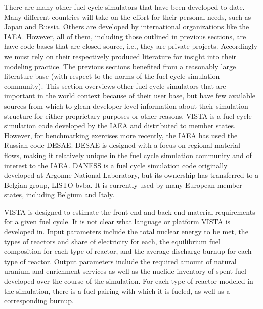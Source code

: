 There are many other fuel cycle simulators that have been developed to
date. Many different countries will take on the effort for their personal needs,
such as Japan and Russia. Others are developed by international organizations
like the IAEA. However, all of them, including those outlined in previous
sections, are have code bases that are closed source, i.e., they are private
projects. Accordingly we must rely on their respectively produced literature for
insight into their modeling practice. The previous sections benefited from a
reasonably large literature base (with respect to the norms of the fuel cycle
simulation community). This section overviews other fuel cycle simulators that
are important in the world context because of their user base, but have few
available sources from which to glean developer-level information about their
simulation structure for either proprietary purposes or other reasons. VISTA is
a fuel cycle simulation code developed by the IAEA and distributed to member
states. However, for benchmarking exercises more recently, the IAEA has used
the Russian code DESAE. DESAE is designed with a focus on regional material
flows, making it relatively unique in the fuel cycle simulation community and of
interest to the IAEA. DANESS is a fuel cycle simulation code originally
developed at Argonne National Laboratory, but its ownership has transferred to a
Belgian group, LISTO bvba. It is currently used by many European member states,
including Belgium and Italy.

VISTA is designed to estimate the front end and back end material requirements
for a given fuel cycle. It is not clear what language or platform VISTA is
developed in. Input parameters include the total nuclear energy to be met, the
types of reactors and share of electricity for each, the equilibrium fuel
composition for each type of reactor, and the average discharge burnup for each
type of reactor. Output parameters include the required amount of natural
uranium and enrichment services as well as the nuclide inventory of spent fuel
developed over the course of the simulation. For each type of reactor modeled in
the simulation, there is a fuel pairing with which it is fueled, as well as a
corresponding burnup.

